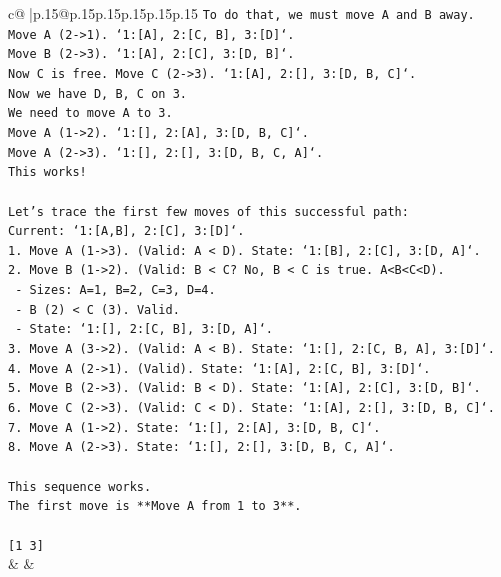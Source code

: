 \documentclass{article}
\begin{document}
{\begin{supertabular}{c@{$\;$}|p{.15\linewidth}@{}p{.15\linewidth}p{.15\linewidth}p{.15\linewidth}p{.15\linewidth}p{.15\linewidth}}
{{{\texttt{To do that, we must move A and B away.} \\
\texttt{Move A (2{-}>1). `1:{[}A{]}, 2:{[}C, B{]}, 3:{[}D{]}`.} \\
\texttt{Move B (2{-}>3). `1:{[}A{]}, 2:{[}C{]}, 3:{[}D, B{]}`.} \\
\texttt{Now C is free. Move C (2{-}>3). `1:{[}A{]}, 2:{[}{]}, 3:{[}D, B, C{]}`.} \\
\texttt{Now we have D, B, C on 3.} \\
\texttt{We need to move A to 3.} \\
\texttt{Move A (1{-}>2). `1:{[}{]}, 2:{[}A{]}, 3:{[}D, B, C{]}`.} \\
\texttt{Move A (2{-}>3). `1:{[}{]}, 2:{[}{]}, 3:{[}D, B, C, A{]}`.} \\
\texttt{This works!} \\
\\ 
\texttt{Let's trace the first few moves of this successful path:} \\
\texttt{Current: `1:{[}A,B{]}, 2:{[}C{]}, 3:{[}D{]}`.} \\
\texttt{1. Move A (1{-}>3). (Valid: A < D). State: `1:{[}B{]}, 2:{[}C{]}, 3:{[}D, A{]}`.} \\
\texttt{2. Move B (1{-}>2). (Valid: B < C? No, B < C is true. A<B<C<D).} \\
\texttt{   {-} Sizes: A=1, B=2, C=3, D=4.} \\
\texttt{   {-} B (2) < C (3). Valid.} \\
\texttt{   {-} State: `1:{[}{]}, 2:{[}C, B{]}, 3:{[}D, A{]}`.} \\
\texttt{3. Move A (3{-}>2). (Valid: A < B). State: `1:{[}{]}, 2:{[}C, B, A{]}, 3:{[}D{]}`.} \\
\texttt{4. Move A (2{-}>1). (Valid). State: `1:{[}A{]}, 2:{[}C, B{]}, 3:{[}D{]}`.} \\
\texttt{5. Move B (2{-}>3). (Valid: B < D). State: `1:{[}A{]}, 2:{[}C{]}, 3:{[}D, B{]}`.} \\
\texttt{6. Move C (2{-}>3). (Valid: C < D). State: `1:{[}A{]}, 2:{[}{]}, 3:{[}D, B, C{]}`.} \\
\texttt{7. Move A (1{-}>2). State: `1:{[}{]}, 2:{[}A{]}, 3:{[}D, B, C{]}`.} \\
\texttt{8. Move A (2{-}>3). State: `1:{[}{]}, 2:{[}{]}, 3:{[}D, B, C, A{]}`.} \\
\\ 
\texttt{This sequence works.} \\
\texttt{The first move is **Move A from 1 to 3**.} \\
\\ 
\texttt{{[}1 3{]}} \\
            }
        }
    }
    & & \\ \\


\end{supertabular}}
\end{document}
